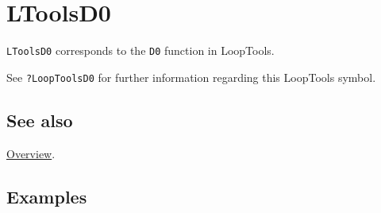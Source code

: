 \documentclass[../FeynHelpersManual.tex]{subfiles}
\begin{document}
\hypertarget{ltoolsd0}{
\section{LToolsD0}\label{ltoolsd0}}

\texttt{LToolsD0} corresponds to the \texttt{D0} function in LoopTools.

See \texttt{?LoopTools\textasciigrave D0} for further information
regarding this LoopTools symbol.

\subsection{See also}

\hyperlink{toc}{Overview}.

\subsection{Examples}
\end{document}
